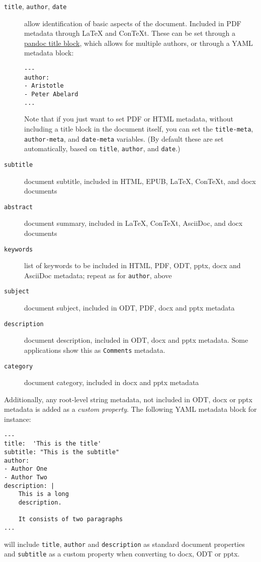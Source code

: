 \begin{description}
\item[\texttt{title}, \texttt{author}, \texttt{date}]
allow identification of basic aspects of the document. Included in PDF
metadata through LaTeX and ConTeXt. These can be set through a
\protect\hyperlink{extension-pandoc_title_block}{pandoc title block},
which allows for multiple authors, or through a YAML metadata block:

\begin{verbatim}
---
author:
- Aristotle
- Peter Abelard
...
\end{verbatim}

Note that if you just want to set PDF or HTML metadata, without
including a title block in the document itself, you can set the
\texttt{title-meta}, \texttt{author-meta}, and \texttt{date-meta}
variables. (By default these are set automatically, based on
\texttt{title}, \texttt{author}, and \texttt{date}.)
\item[\texttt{subtitle}]
document subtitle, included in HTML, EPUB, LaTeX, ConTeXt, and docx
documents
\item[\texttt{abstract}]
document summary, included in LaTeX, ConTeXt, AsciiDoc, and docx
documents
\item[\texttt{keywords}]
list of keywords to be included in HTML, PDF, ODT, pptx, docx and
AsciiDoc metadata; repeat as for \texttt{author}, above
\item[\texttt{subject}]
document subject, included in ODT, PDF, docx and pptx metadata
\item[\texttt{description}]
document description, included in ODT, docx and pptx metadata. Some
applications show this as \texttt{Comments} metadata.
\item[\texttt{category}]
document category, included in docx and pptx metadata
\end{description}

Additionally, any root-level string metadata, not included in ODT, docx
or pptx metadata is added as a \emph{custom property}. The following
YAML metadata block for instance:

\begin{verbatim}
---
title:  'This is the title'
subtitle: "This is the subtitle"
author:
- Author One
- Author Two
description: |
    This is a long
    description.

    It consists of two paragraphs
...
\end{verbatim}

will include \texttt{title}, \texttt{author} and \texttt{description} as
standard document properties and \texttt{subtitle} as a custom property
when converting to docx, ODT or pptx.

